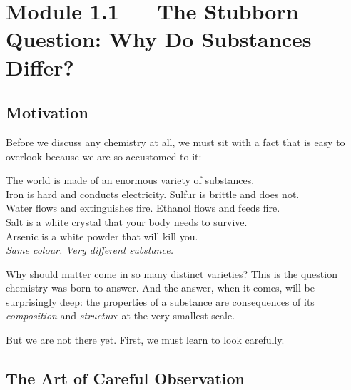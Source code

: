 \documentclass[12pt, a4paper]{book}
\theoremstyle{definition}
\begin{document}
\vspace{1.5em}

\section{Module 1.1 — The Stubborn Question: Why Do Substances Differ?}
\label{sec:mod1.1}

\subsection*{Motivation}

Before we discuss any chemistry at all, we must sit with a fact that is
easy to overlook because we are so accustomed to it:

\begin{center}
\begin{tcolorbox}[
  enhanced, colback=LightBg, colframe=JourneyColor!40,
  width=0.88\textwidth, arc=3pt
]
\centering\sffamily
The world is made of an enormous variety of substances.\\[4pt]
Iron is hard and conducts electricity.
Sulfur is brittle and does not.\\
Water flows and extinguishes fire.
Ethanol flows and feeds fire.\\
Salt is a white crystal that your body needs to survive.\\
Arsenic is a white powder that will kill you.\\[4pt]
\textit{Same colour. Very different substance.}
\end{tcolorbox}
\end{center}

\vspace{0.5em}

Why should matter come in so many distinct varieties?
This is the question chemistry was born to answer.
And the answer, when it comes, will be surprisingly deep:
the properties of a substance are consequences of its \emph{composition}
and \emph{structure} at the very smallest scale.

But we are not there yet.
First, we must learn to look carefully.

\subsection{The Art of Careful Observation}
\end{document}
